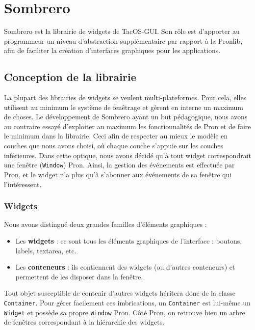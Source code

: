 \section{Sombrero}

Sombrero est la librairie de widgets de TacOS-GUI.
Son rôle est d'apporter au programmeur un niveau d'abstraction supplémentaire par rapport à la Pronlib, afin de faciliter la création d'interfaces graphiques pour les applications.

\subsection{Conception de la librairie}

La plupart des librairies de widgets se veulent multi-plateformes.
Pour cela, elles utilisent au minimum le système de fenêtrage et gèrent en interne un maximum de choses.
Le développement de Sombrero ayant un but pédagogique, nous avons au contraire essayé d'exploiter au maximum les fonctionnalités de Pron et de faire le minimum dans la librairie. Ceci afin de respecter au mieux le modèle en couches que nous avons choisi, où chaque couche s'appuie sur les couches inférieures.
Dans cette optique, nous avons décidé qu'à tout widget correspondrait une fenêtre (\verb|Window|) Pron.
Ainsi, la gestion des événements est effectuée par Pron, et le widget n'a plus qu'à s'abonner aux événements de sa fenêtre qui l'intéressent.

\subsubsection{Widgets}

Nous avons distingué deux grandes familles d'éléments graphiques :

\begin{itemize}
  \item Les \textbf{widgets} : ce sont tous les éléments graphiques de l'interface : boutons, labels, textarea, etc.
  \item Les \textbf{conteneurs} : ils contiennent des widgets (ou d'autres conteneurs) et permettent de les disposer dans la fenêtre.
\end{itemize}

Tout objet susceptible de contenir d'autres widgets héritera donc de la classe \verb|Container|.
Pour gérer facilement ces imbrications, un \verb|Container| est lui-même un \verb|Widget| et possède sa propre \verb|Window| Pron.
Côté Pron, on retrouve bien un arbre de fenêtres correspondant à la hiérarchie des widgets.

